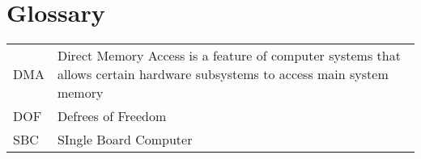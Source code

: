 \section{Glossary}
\begin{table}[H]
    
    \begin{tabular}{p{} p{}}
       DMA  & Direct Memory Access is a feature of computer systems that allows certain hardware subsystems to access main system memory  \\
       DOF & Defrees of Freedom\\
       SBC & SIngle Board Computer
    \end{tabular}
\end{table}
